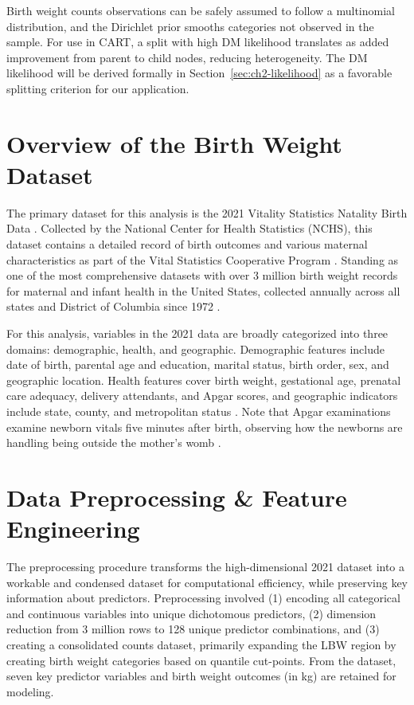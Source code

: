 Birth weight counts observations can be safely assumed to follow a multinomial distribution, and the Dirichlet prior smooths categories not observed in the sample. For use in CART, a split with high DM likelihood translates as added improvement from parent to child nodes, reducing heterogeneity. The DM likelihood will be derived formally in Section~\ref{sec:ch2-likelihood} as a favorable splitting criterion for our application.

 \section{Overview of the Birth Weight Dataset}
\label{sec:ch2-introduction}

The primary dataset for this analysis is the 2021 Vitality Statistics Natality Birth Data \parencite{nber_birth_data}. Collected by the National Center for Health Statistics (NCHS), this dataset contains a detailed record of birth outcomes and various maternal characteristics as part of the Vital Statistics Cooperative Program \parencite{jain2024, nber_birth_data}. Standing as one of the most comprehensive datasets with over 3 million birth weight records for maternal and infant health in the United States, collected annually across all states and District of Columbia since 1972 \parencite{nber_birth_data}.

For this analysis, variables in the 2021 data are broadly categorized into three domains: demographic, health, and geographic. Demographic features include date of birth, parental age and education, marital status, birth order, sex, and geographic location. Health features cover birth weight, gestational age, prenatal care adequacy, delivery attendants, and Apgar scores, and geographic indicators include state, county, and metropolitan  status \parencite{nber_birth_data}. Note that Apgar examinations examine newborn vitals five minutes after birth, observing how the newborns are handling being outside the mother's womb  \parencite{apgar_score}. 

\section{Data Preprocessing \& Feature Engineering}
\label{sec:ch2-preprocessing}

The preprocessing procedure transforms the high-dimensional 2021 dataset into a workable and condensed dataset for computational efficiency, while preserving key information about predictors. Preprocessing involved (1) encoding all categorical and continuous variables into unique dichotomous predictors, (2) dimension reduction from 3 million rows to 128 unique predictor combinations, and (3) creating a consolidated counts dataset, primarily expanding the LBW region by creating birth weight categories based on quantile cut-points. From the dataset, seven key predictor variables and birth weight outcomes (in kg) are retained for modeling. 


